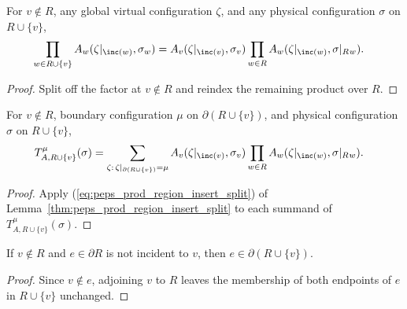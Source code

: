 
\begin{lemma}%
    \label{thm:peps_prod_region_insert_split}
    \leanok
    For $v\notin R$, any global virtual configuration $\zeta$, and any physical configuration $\sigma$ on $R\cup\{v\}$,
    \begin{align}
        \prod_{w\in R\cup\{v\}}A_w(\zeta|_{\inc(w)},\sigma_w)
         & =
        A_v(\zeta|_{\inc(v)},\sigma_v)
        \prod_{w\in R}A_w(\zeta|_{\inc(w)},\sigma|_R{}_w).
        \label{eq:peps_prod_region_insert_split}
    \end{align}
\end{lemma}
\begin{proof}\leanok
    Split off the factor at $v\notin R$ and reindex the remaining product over $R$.
\end{proof}

\begin{lemma}%
    \label{thm:peps_regionBlockedWeight_insert_eq_sum_split}
    \leanok
    For $v\notin R$, boundary configuration $\mu$ on $\partial(R\cup\{v\})$, and physical configuration $\sigma$ on $R\cup\{v\}$,
    \begin{align}
        T_{A,R\cup\{v\}}^{\mu}(\sigma)
         & =
        \sum_{\zeta:\,\zeta|_{\partial(R\cup\{v\})}=\mu}
        A_v(\zeta|_{\inc(v)},\sigma_v)
        \prod_{w\in R}A_w(\zeta|_{\inc(w)},\sigma|_R{}_w).
        \label{eq:peps_region_blocked_weight_insert}
    \end{align}
\end{lemma}
\begin{proof}\leanok
    Apply (\ref{eq:peps_prod_region_insert_split}) of Lemma~\ref{thm:peps_prod_region_insert_split} to each summand of $T_{A,R\cup\{v\}}^{\mu}(\sigma)$.
\end{proof}

\begin{lemma}%
    \label{thm:peps_isRegionBoundaryEdge_insert_of_not_incident}
    \leanok
    If $v\notin R$ and $e\in\partial R$ is not incident to $v$, then $e\in\partial(R\cup\{v\})$.
\end{lemma}
\begin{proof}\leanok
    Since $v\notin e$, adjoining $v$ to $R$ leaves the membership of both endpoints of $e$ in $R\cup\{v\}$ unchanged.
\end{proof}

